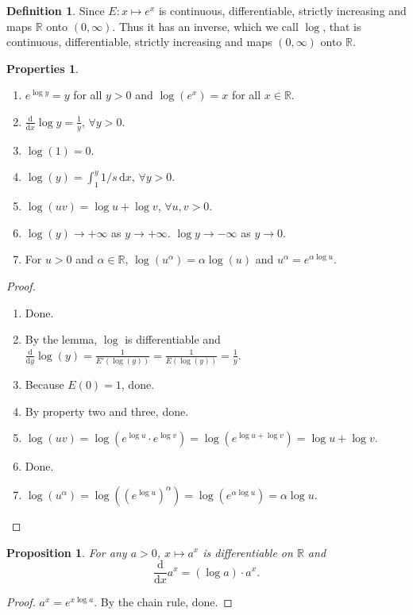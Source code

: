 \documentclass[12pt]{article}
\theoremstyle{plain}
\newtheorem*{prop}{Proposition}
\theoremstyle{definition}
\newtheorem*{defn}{Definition}
\newtheorem*{property}{Properties}
\begin{document}
\begin{defn}
    Since $E:x\mapsto e^x$ is continuous, differentiable, strictly increasing and maps $\mathbb{R}$ onto
    $(0,\infty)$. Thus it has an inverse, which we call $\log$, that is continuous, differentiable, strictly increasing
    and maps $(0,\infty)$ onto $\mathbb{R}$.
\end{defn}
\begin{property}
    \begin{enumerate}
        \item $e^{\log y} = y$ for all $y>0$ and $\log(e^x) = x$ for all $x\in \mathbb{R}$.
        \item $\frac{\mathrm{d}}{\mathrm{d}x}\log y = \frac{1}{y}$, $\forall y>0$.
        \item $\log(1) = 0$.
        \item $\log(y) = \int_1^y 1/s\,\mathrm{d}x$, $\forall y>0$.
        \item $\log(uv) = \log u + \log v$, $\forall u,v>0$.
        \item $\log(y)\rightarrow +\infty$ as $y\rightarrow +\infty$.
            $\log y\rightarrow-\infty$ as $y\rightarrow0$.
        \item For $u>0$ and $\alpha\in\mathbb{R}$, $\log(u^\alpha) = \alpha \log(u)$ and $u^\alpha = e^{\alpha\log u}$.
    \end{enumerate}
\end{property}
\begin{proof}
    \begin{enumerate}
        \item Done.
        \item By the lemma, $\log$ is differentiable and $\frac{\mathrm{d}}{\mathrm{d}y} \log(y) = \frac{1}{E'(\log
            (y))} = \frac{1}{E(\log(y))}=\frac{1}{y}$.
        \item Because $E(0) = 1$, done.
        \item By property two and three, done.
        \item $\log(uv) = \log(e^{\log u} \cdot e^{\log v}) = \log(e^{\log u+\log v}) = \log u + \log v$.
        \item Done.
        \item $\log(u^\alpha) = \log((e^{\log u})^\alpha) = \log(e^{\alpha \log u}) = \alpha \log u$.
    \end{enumerate}
\end{proof}

\begin{prop}
    For any $a>0$, $x\mapsto a^x$ is differentiable on $\mathbb{R}$ and
    \[\frac{\mathrm{d}}{\mathrm{d}x} a^x = (\log a)\cdot a^x.\]
\end{prop}
\begin{proof}
    $a^x = e^{x\log a}$. By the chain rule, done.
\end{proof}
\end{document}
